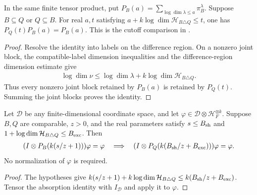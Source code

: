 \begin{theorem}
    \label{thm:matched_schur_cutoff_absorption}
    \leanok
    In the same finite tensor product, put
    $P_B(a)=\sum_{\log\dim\lambda\leq a}\pi_B^\lambda$.
    Suppose $B\subseteq Q$ or $Q\subseteq B$. For real $a,t$ satisfying
    $a+k\log\dim\mathcal H_{B\triangle Q}\leq t$, one has
    $P_Q(t)P_B(a)=P_B(a)$.
    This is the cutoff comparison in
    \cite[Section~8, lines~356--365]{OpenAI2026AreaLaw}.
\end{theorem}
\begin{proof}\leanok
    Resolve the identity into labels on the difference region. On a
    nonzero joint block, the compatible-label dimension inequalities and
    the difference-region dimension estimate give
    \begin{align*}
        \log\dim\nu\leq\log\dim\lambda+k\log\dim\mathcal H_{B\triangle Q}.
    \end{align*}
    Thus every nonzero joint block retained by $P_B(a)$ is retained by
    $P_Q(t)$. Summing the joint blocks proves the identity.
\end{proof}

\begin{theorem}
    \label{thm:matched_schur_cutoff_vector}
    \leanok
    Let $\mathcal D$ be any finite-dimensional coordinate space, and
    let $\varphi\in\mathcal D\otimes\mathcal H_F^{\otimes k}$.
    Suppose $B,Q$ are comparable, $z>0$, and the real parameters satisfy
    $s\leq B_{\rm sh}$ and
    $1+\log\dim\mathcal H_{B\triangle Q}\leq B_{\rm exc}$.
    Then
    \begin{align*}
        (I\otimes P_B(k(s/z+1)))\varphi=\varphi
        \quad\Longrightarrow\quad
        (I\otimes P_Q(k(B_{\rm sh}/z+B_{\rm exc})))\varphi=\varphi.
    \end{align*}
    No normalization of $\varphi$ is required.
\end{theorem}
\begin{proof}\leanok
    The hypotheses give
    $k(s/z+1)+k\log\dim\mathcal H_{B\triangle Q}
    \leq k(B_{\rm sh}/z+B_{\rm exc})$.
    Tensor the absorption identity with $I_{\mathcal D}$ and apply it
    to $\varphi$.
\end{proof}

